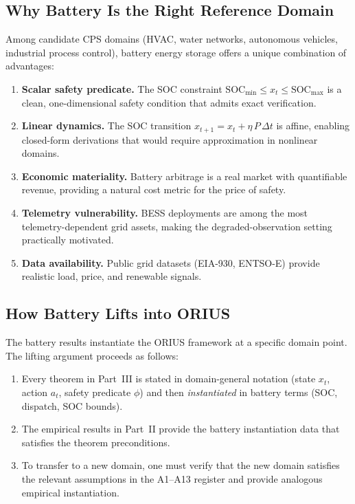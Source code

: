 \subsection{Why Battery Is the Right Reference Domain}

Among candidate CPS domains (HVAC, water networks, autonomous vehicles,
industrial process control), battery energy storage offers a unique
combination of advantages:

\begin{enumerate}
  \item \textbf{Scalar safety predicate.}  The SOC constraint
    $\text{SOC}_{\min} \le x_t \le \text{SOC}_{\max}$ is a clean,
    one-dimensional safety condition that admits exact verification.
  \item \textbf{Linear dynamics.}  The SOC transition
    $x_{t+1} = x_t + \eta\,P\,\Delta t$ is affine, enabling closed-form
    derivations that would require approximation in nonlinear domains.
  \item \textbf{Economic materiality.}  Battery arbitrage is a real
    market with quantifiable revenue, providing a natural cost metric
    for the price of safety.
  \item \textbf{Telemetry vulnerability.}  BESS deployments are
    among the most telemetry-dependent grid assets, making the
    degraded-observation setting practically motivated.
  \item \textbf{Data availability.}  Public grid datasets (EIA-930,
    ENTSO-E) provide realistic load, price, and renewable signals.
\end{enumerate}

\subsection{How Battery Lifts into ORIUS}

The battery results instantiate the ORIUS framework at a specific
domain point.  The lifting argument proceeds as follows:

\begin{enumerate}
  \item Every theorem in Part~III is stated in domain-general notation
    (state $x_t$, action $a_t$, safety predicate $\phi$) and then
    \emph{instantiated} in battery terms (SOC, dispatch, SOC bounds).
  \item The empirical results in Part~II provide the battery instantiation
    data that satisfies the theorem preconditions.
  \item To transfer to a new domain, one must verify that the new
    domain satisfies the relevant assumptions in the A1--A13 register and provide
    analogous empirical instantiation.
\end{enumerate}

